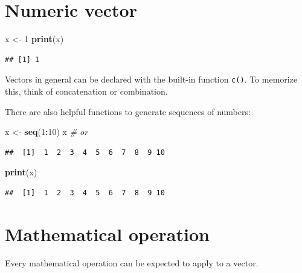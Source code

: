 \documentclass[
]{book}
\newenvironment{Shaded}{\begin{snugshade}}{\end{snugshade}}
\newcommand{\CommentTok}[1]{\textcolor[rgb]{0.56,0.35,0.01}{\textit{#1}}}
\newcommand{\DecValTok}[1]{\textcolor[rgb]{0.00,0.00,0.81}{#1}}
\newcommand{\FunctionTok}[1]{\textcolor[rgb]{0.13,0.29,0.53}{\textbf{#1}}}
\newcommand{\NormalTok}[1]{#1}
\newcommand{\OtherTok}[1]{\textcolor[rgb]{0.56,0.35,0.01}{#1}}
\newcommand{\SpecialCharTok}[1]{\textcolor[rgb]{0.81,0.36,0.00}{\textbf{#1}}}
\begin{document}
\hypertarget{numeric-vector}{%
\section{Numeric vector}\label{numeric-vector}}

\begin{Shaded}
\begin{Highlighting}[]
\NormalTok{x }\OtherTok{\textless{}{-}} \DecValTok{1}
\FunctionTok{print}\NormalTok{(x)}
\end{Highlighting}
\end{Shaded}

\begin{verbatim}
## [1] 1
\end{verbatim}

Vectors in general can be declared with the built-in function \texttt{c()}. To memorize this, think of concatenation or combination.

There are also helpful functions to generate sequences of numbers:

\begin{Shaded}
\begin{Highlighting}[]
\NormalTok{x }\OtherTok{\textless{}{-}} \FunctionTok{seq}\NormalTok{(}\DecValTok{1}\SpecialCharTok{:}\DecValTok{10}\NormalTok{)}
\NormalTok{x }\CommentTok{\# or}
\end{Highlighting}
\end{Shaded}

\begin{verbatim}
##  [1]  1  2  3  4  5  6  7  8  9 10
\end{verbatim}

\begin{Shaded}
\begin{Highlighting}[]
\FunctionTok{print}\NormalTok{(x)}
\end{Highlighting}
\end{Shaded}

\begin{verbatim}
##  [1]  1  2  3  4  5  6  7  8  9 10
\end{verbatim}

\hypertarget{mathematical-operation}{%
\section{Mathematical operation}\label{mathematical-operation}}

Every mathematical operation can be expected to apply to a vector.
\end{document}
